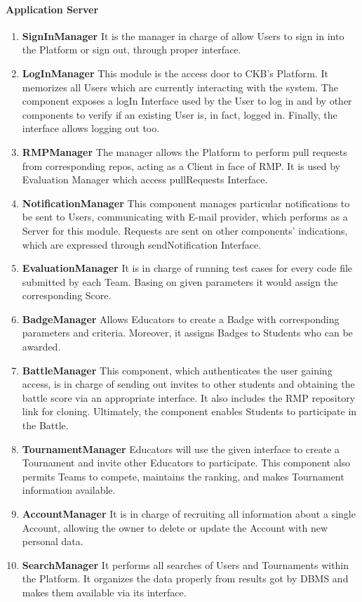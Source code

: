 \paragraph{Application Server}
\begin{enumerate}
    \item \textbf{SignInManager} It is the manager in charge of allow Users to sign in into the Platform or sign out, through proper interface.
    \item \textbf{LogInManager} This module is the access door to CKB's Platform. It memorizes all Users which are currently interacting with the system. The component exposes a logIn Interface used by the User to log in 
    and by other components to verify if an existing User is, in fact, logged in. Finally, the interface allows logging out too.
    \item \textbf{RMPManager} The manager allows the Platform to perform pull requests from corresponding repos, acting as a Client in face of RMP. It is used by Evaluation Manager which access pullRequests Interface.
    \item \textbf{NotificationManager} This component manages particular notifications to be sent to Users, communicating with E-mail provider, which performs as a Server for this module. Requests are sent on other 
    components' indications, which are expressed through sendNotification Interface.
    \item \textbf{EvaluationManager} It is in charge of running test cases for every code file submitted by each Team. Basing on given parameters it would assign the corresponding Score.
    \item \textbf{BadgeManager} Allows Educators to create a Badge with corresponding parameters and criteria. Moreover, it assigns Badges to Students who can be awarded.
    \item \textbf{BattleManager} This component, which authenticates the user gaining access, is in charge of sending out invites to other students and obtaining the battle score via an appropriate interface. It also 
    includes the RMP repository link for cloning. Ultimately, the component enables Students to participate in the Battle.
    \item \textbf{TournamentManager} Educators will use the given interface to create a Tournament and invite other Educators to participate. This component also permits Teams to compete, maintains the ranking, and makes
    Tournament information available.
    \item \textbf{AccountManager} It is in charge of recruiting all information about a single Account, allowing the owner to delete or update the Account with new personal data.
    \item \textbf{SearchManager} It performs all searches of Users and Tournaments within the Platform. It organizes the data properly from results got by DBMS and makes them available via its interface.
\end{enumerate}
\newpage

